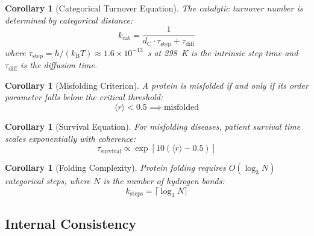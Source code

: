 \documentclass[aps,prx,superscriptaddress,twocolumn,10pt,a4paper,longbibliography,preprint]{revtex4-2}
\newcommand{\dC}{d_{\mathrm{C}}}
\newcommand{\kcat}{k_{\mathrm{cat}}}
\newcommand{\kB}{k_{\mathrm{B}}}
\newcommand{\orderp}{\langle r \rangle}
\newtheorem{corollary}[theorem]{Corollary}
\theoremstyle{definition}
\theoremstyle{remark}
\begin{document}
\begin{corollary}[Categorical Turnover Equation]
\label{cor:turnover}
The catalytic turnover number is determined by categorical distance:
\begin{equation}
\kcat = \frac{1}{\dC \cdot \tau_{\text{step}} + \tau_{\text{diff}}}
\label{eq:turnover}
\end{equation}
where $\tau_{\text{step}} = h/(\kB T) \approx 1.6 \times 10^{-13}$~s at 298~K is the intrinsic step time and $\tau_{\text{diff}}$ is the diffusion time.
\end{corollary}

\begin{corollary}[Misfolding Criterion]
\label{cor:misfolding}
A protein is misfolded if and only if its order parameter falls below the critical threshold:
\begin{equation}
\orderp < 0.5 \implies \text{misfolded}
\label{eq:misfolding}
\end{equation}
\end{corollary}

\begin{corollary}[Survival Equation]
\label{cor:survival}
For misfolding diseases, patient survival time scales exponentially with coherence:
\begin{equation}
\tau_{\text{survival}} \propto \exp\left[10\left(\orderp - 0.5\right)\right]
\label{eq:survival}
\end{equation}
\end{corollary}

\begin{corollary}[Folding Complexity]
\label{cor:folding}
Protein folding requires $O(\log_3 N)$ categorical steps, where $N$ is the number of hydrogen bonds:
\begin{equation}
k_{\text{steps}} = \lceil \log_3 N \rceil
\label{eq:folding_complexity}
\end{equation}
\end{corollary}

\subsection{Internal Consistency}
\end{document}
